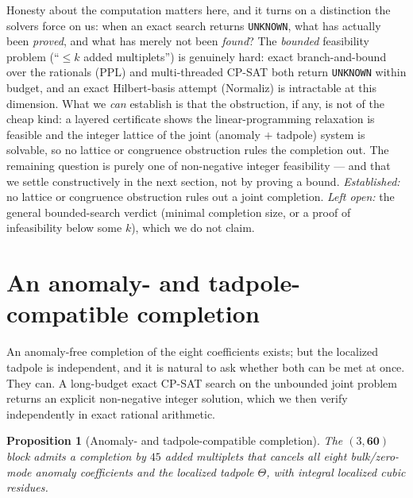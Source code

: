 \documentclass[11pt,a4paper]{article}
\newtheorem{proposition}{Proposition}
\begin{document}
Honesty about the computation matters here, and it turns on a distinction the solvers
force on us: when an exact search returns \texttt{UNKNOWN}, what has actually been
\emph{proved}, and what has merely not been \emph{found}? The \emph{bounded} feasibility
problem (``$\le k$ added multiplets'') is genuinely hard: exact branch-and-bound over the
rationals (PPL) and multi-threaded CP-SAT both return \texttt{UNKNOWN} within budget,
and an exact Hilbert-basis attempt (Normaliz) is intractable at this dimension. What we
\emph{can} establish is that the obstruction, if any, is not of the cheap kind: a
layered certificate shows the linear-programming relaxation is feasible and the integer
lattice of the joint (anomaly $+$ tadpole) system is solvable, so no lattice or
congruence obstruction rules the completion out. The remaining question is purely one
of non-negative integer feasibility --- and that we settle constructively in the next
section, not by proving a bound.
\emph{Established:} no lattice or congruence obstruction rules out a joint completion.
\emph{Left open:} the general bounded-search verdict (minimal completion size, or a
proof of infeasibility below some $k$), which we do not claim.

\section{An anomaly- and tadpole-compatible completion}\label{sec:witness}
An anomaly-free completion of the eight coefficients exists; but the localized tadpole
is independent, and it is natural to ask whether both can be met at once. They can. A
long-budget exact CP-SAT search on the unbounded joint problem returns an explicit
non-negative integer solution, which we then verify independently in exact rational
arithmetic.

\begin{proposition}[Anomaly- and tadpole-compatible completion]\label{prop:witness}
The $(3,\mathbf{60})$ block admits a completion by $45$ added multiplets that cancels
all eight bulk/zero-mode anomaly coefficients and the localized tadpole $\Theta$, with
integral localized cubic residues.
\end{proposition}
\end{document}
